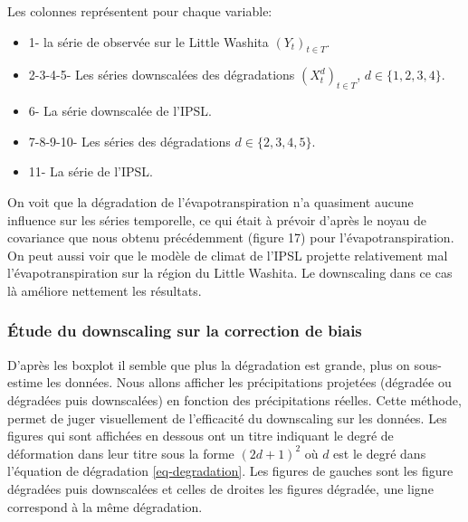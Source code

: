 \documentclass[a4paper,11pt]{article}
\numberwithin{equation}{section}
\begin{document}
Les colonnes représentent pour chaque variable:
\begin{itemize}
	\item 1- la série de observée sur le Little Washita $(Y_t)_{t\in T}$. 
	\item 2-3-4-5- Les séries downscalées des dégradations $(X^d_t)_{t \in T}$, $d \in \{1,2,3,4\}$.
	\item 6- La série downscalée de l'IPSL. 
	\item 7-8-9-10- Les séries des dégradations $d \in \{2,3,4,5\}$.
	\item 11- La série de l'IPSL. 
\end{itemize}
On voit que la dégradation de l'évapotranspiration n'a quasiment aucune influence sur les séries temporelle, ce qui était à prévoir d'après le noyau de covariance que nous obtenu précédemment (figure 17) pour l'évapotranspiration. On peut aussi voir que le modèle de climat de l'IPSL projette relativement mal l'évapotranspiration sur la région du Little Washita. Le downscaling dans ce cas là améliore nettement les résultats.

\subsubsection{Étude du downscaling sur la correction de biais}

D'après les boxplot il semble que plus la dégradation est grande, plus on sous-estime les données. Nous allons afficher les précipitations projetées (dégradée ou dégradées puis downscalées) en fonction des précipitations réelles. Cette méthode, permet de juger visuellement de l'efficacité du downscaling sur les données. Les figures qui sont affichées en dessous ont un titre indiquant le degré de déformation dans leur titre sous la forme $(2d+1)^2$ où $d$ est le degré dans l'équation de dégradation \eqref{eq-degradation}. Les figures de gauches sont les figure dégradées puis downscalées et celles de droites les figures dégradée, une ligne correspond à la même dégradation.	

\vspace{0.7cm}
\end{document}
